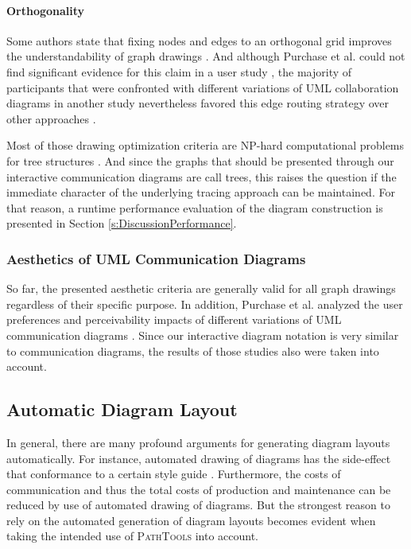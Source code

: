\paragraph{Orthogonality} Some authors state that fixing nodes and edges to an orthogonal grid improves the understandability of graph drawings \cite{sugiyama_methods_1981, batini_what_1985}.
And although Purchase et al. could not find significant evidence for this claim in a user study \cite{purchase_which_1997}, the majority of participants that were confronted with different variations of UML collaboration diagrams in another study nevertheless favored this edge routing strategy over other approaches \cite{purchase_graph_2004}.

Most of those drawing optimization criteria are NP-hard computational problems for tree structures \cite{battista_graph_1998}.
And since the graphs that should be presented through our interactive communication diagrams are call trees, this raises the question if the immediate character of the underlying tracing approach can be maintained.
For that reason, a runtime performance evaluation of the diagram construction is presented in Section \ref{s:DiscussionPerformance}.

\subsubsection{Aesthetics of UML Communication Diagrams}
So far, the presented aesthetic criteria are generally valid for all graph drawings regardless of their specific purpose.
In addition, Purchase et al. analyzed the user preferences and perceivability impacts of different variations of UML communication diagrams \cite{purchase_uml_2002, purchase_graph_2004}.
Since our interactive diagram notation is very similar to communication diagrams, the results of those studies also were taken into account.

\subsection{Automatic Diagram Layout}
In general, there are many profound arguments for generating diagram layouts automatically.
For instance, automated drawing of diagrams has the side-effect that conformance to a certain style guide .
Furthermore, the costs of communication and thus the total costs of production and maintenance can be reduced by use of automated drawing of diagrams.
But the strongest reason to rely on the automated generation of diagram layouts becomes evident when taking the intended use of \textsc{PathTools} into account.

